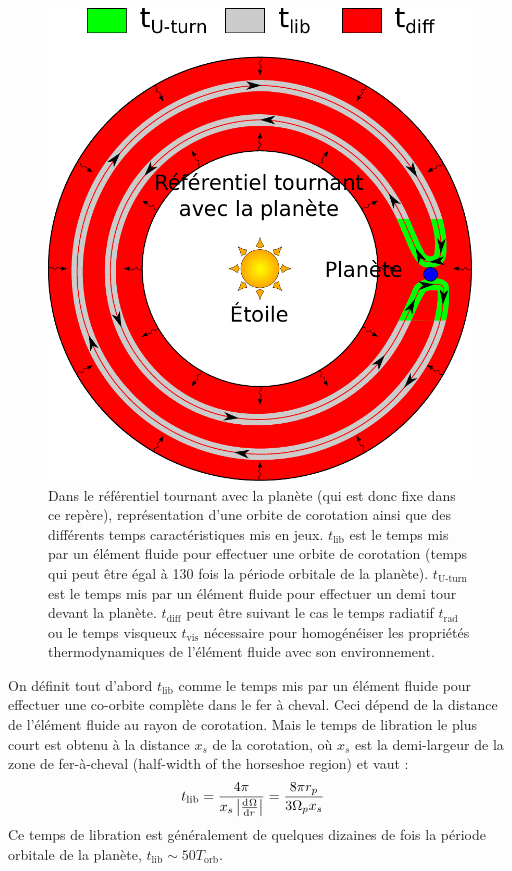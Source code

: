 \begin{figure}[htb]
\centering
\includegraphics[width=0.75\linewidth]{figure/corotation_times.pdf}
\caption{Dans le référentiel tournant avec la planète (qui est donc fixe dans ce repère), représentation d'une orbite de corotation ainsi que des différents temps caractéristiques mis en jeux. $t_\text{lib}$ est le temps mis par un élément fluide pour effectuer une orbite de corotation (temps qui peut être égal à 130 fois la période orbitale de la planète). $t_\text{U-turn}$ est le temps mis par un élément fluide pour effectuer un demi tour devant la planète. $t_\text{diff}$ peut être suivant le cas le temps radiatif $t_\text{rad}$ ou le temps visqueux $t_\text{vis}$ nécessaire pour homogénéiser les propriétés thermodynamiques de l'élément fluide avec son environnement.}\label{fig:corotation_orbits}
\end{figure}

On définit tout d'abord $t_\text{lib}$ comme le temps mis par un élément fluide pour effectuer une co-orbite complète dans le fer à cheval. Ceci dépend de la distance de l'élément fluide au rayon de corotation. Mais le temps de libration le plus court est obtenu à la distance $x_s$ de la corotation, où $x_s$ est la demi-largeur de la zone de fer-à-cheval (\og half-width of the horseshoe region\fg) et vaut \citep[eq. (52)]{baruteau2008corotation} : 
\begin{align}
t_\text{lib} &= \frac{4\pi}{x_s\abs{\od{\Omega}{r}}} = \frac{8\pi r_p}{3\Omega_p x_s}
\end{align}
Ce temps de libration est généralement de quelques dizaines de fois la période orbitale de la planète, $t_\text{lib} \sim 50 T_\text{orb}$. 


